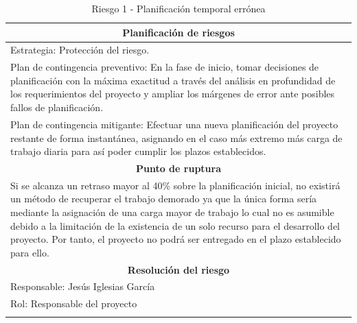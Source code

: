 \documentclass[12pt,a4paper, twoside]{report}
\begin{document}
\begin{longtable}{m{4cm}|m{5cm}|m{4cm}}
		\multicolumn{3}{|c|}{\textbf{Planificación de riesgos}} \\ \hline \hline
		\multicolumn{3}{|p{17cm}|}{Estrategia: Protección del riesgo.} \\ \hline
		\multicolumn{3}{|p{17cm}|}{Plan de contingencia preventivo: En la fase de inicio, tomar decisiones de planificación con la máxima exactitud a través del análisis en profundidad de los requerimientos del proyecto y ampliar los márgenes de error ante posibles fallos de planificación.} \\ \hline
		\multicolumn{3}{|p{17cm}|}{Plan de contingencia mitigante: Efectuar una nueva planificación del proyecto restante de forma instantánea, asignando en el caso más extremo más carga de trabajo diaria para así poder cumplir los plazos establecidos.} \\ \hline
				
		\multicolumn{3}{|c|}{\textbf{Punto de ruptura}} \\ \hline \hline
		\multicolumn{3}{|p{17cm}|}{Si se alcanza un retraso mayor al 40\% sobre la planificación inicial, no existirá un método de recuperar el trabajo demorado ya que la única forma sería mediante la asignación de una carga mayor de trabajo lo cual no es asumible debido a la limitación de la existencia de un solo recurso para el desarrollo del proyecto. Por tanto, el proyecto no podrá ser entregado en el plazo establecido para ello.}\\ \hline
				
		\multicolumn{3}{|c|}{\textbf{Resolución del riesgo}} \\ \hline \hline
		\multicolumn{3}{|p{17cm}|}{Responsable: Jesús Iglesias García}\\ \hline
		\multicolumn{3}{|p{17cm}|}{Rol: Responsable del proyecto} \\ \hline
		\caption{Riesgo 1 - Planificación temporal errónea}
	\end{longtable}
	
	\hspace{1cm}
			
\end{document}
